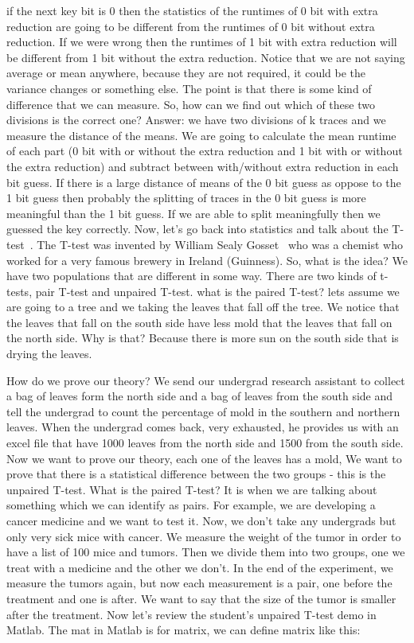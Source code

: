 if the next key bit is 0 then the statistics of the runtimes of 0 bit with extra
reduction are going to be different from the runtimes of 0 bit without extra
reduction. If we were wrong then the runtimes of 1 bit with extra reduction will
be different from 1 bit without the extra reduction. Notice that we are not saying
average or mean anywhere, because they are not required, it could be the
variance changes or something else. The point is that there is some kind of
difference that we can measure. So, how can we find out which of these two
divisions is the correct one? Answer: we have two divisions of k traces and we
measure the distance of the means. We are going to calculate the mean runtime of each
part (0 bit with or without the extra reduction and 1 bit with or without the
extra reduction) and subtract between with/without extra reduction in each bit
guess. If there is a large distance of means of the 0 bit guess as oppose to the
1 bit guess then probably the splitting of traces in the 0 bit guess is more
meaningful than the 1 bit guess. If we are able to split meaningfully then we
guessed the key correctly. Now, let's go back into statistics and talk about the
T-test~\cite{wikittest}. The T-test was invented by William Sealy
Gosset~\cite{wikigosset} who was a chemist who worked for a very famous brewery
in Ireland (Guinness). So, what is the idea? We have two populations that are
different in some way. There are two kinds of t-tests, pair T-test and unpaired
T-test. what is the paired T-test? lets assume we are going to a
tree and we taking the leaves that fall off the tree. We notice that the leaves
that fall on the south side have less mold that the leaves that fall
on the north side. Why is that? Because there is more sun on the south side that
is drying the leaves. 

How do we prove our theory? We send our undergrad research assistant to collect
a bag of leaves form the north side and a bag of leaves from the south side and 
tell the undergrad to count the percentage of mold in the southern and northern
leaves. When the undergrad comes back, very exhausted, he provides us with an
excel file that have 1000 leaves from the north side and 1500 from the south
side. Now we want to prove our theory, each one of the leaves has a mold, We
want to prove that there is a statistical difference between the two groups - 
this is the unpaired T-test. What is the paired T-test? 
It is when we are talking about
something which we can identify as pairs. For example, we are developing a
cancer medicine and we want to test it. Now, we don't take any undergrads but
only very sick mice with cancer. We measure the weight of the tumor in order to
have a list of 100 mice and tumors. Then we divide them into two groups, one we
treat with a medicine and the other we don't. In the end of the experiment, we
measure the tumors again, but now each measurement is a pair, one before the
treatment and one is after. We want to say that the size of the tumor is
smaller after the treatment. Now let's review the student's unpaired T-test demo
in Matlab. The mat in Matlab is for matrix, we can define matrix like this:

